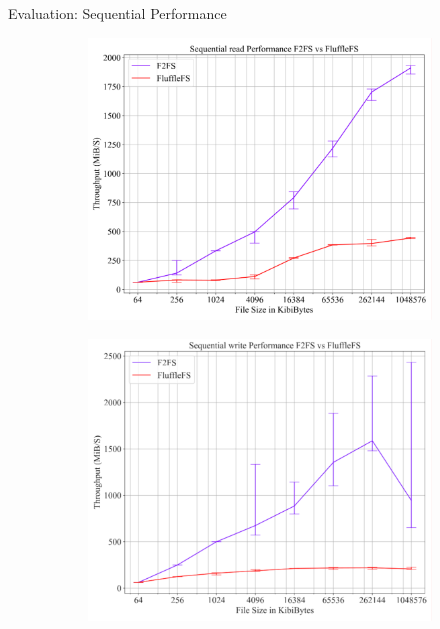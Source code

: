 \documentclass{beamer}
\begin{document}
\begin{frame}{Evaluation: Sequential Performance}
	\begingroup
	\begin{figure}
		\begin{subfigure}{0.5\textwidth}
			\centering
			\includegraphics[width=1.0\linewidth]{resources/images/results-sequential.pdf}
		\end{subfigure}%
		\begin{subfigure}{0.5\textwidth}
			\centering
			\includegraphics[width=1.0\linewidth]{resources/images/results-sequential-write.pdf}
		\end{subfigure}
	\end{figure}
	\endgroup
\end{frame}
\end{document}
